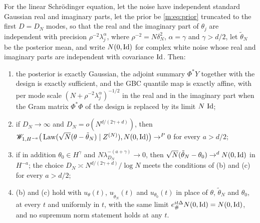 \begin{proposition}\label{m:prop:sch}
For the linear Schr\"odinger equation, let the noise have independent standard Gaussian real and imaginary parts, let the prior be \eqref{m:eq:prior} truncated to the first $D=D_N$ modes, so that the real and the imaginary part of $\theta_j$ are independent with precision $\rho^{-2}\lambda_j^\alpha$, where $\rho^{-2}=N\delta_N^2$, $\alpha=\gamma$ and $\gamma>d/2$, let $\tilde\theta_N$ be the posterior mean, and write $N(0,\operatorname{Id})$ for complex white noise whose real and imaginary parts are independent with covariance $\operatorname{Id}$. Then:
\begin{enumerate}[label=(\alph*),nosep,leftmargin=2.2em]
\item the posterior is exactly Gaussian, the adjoint summary $\Phi^*Y$ together with the design is exactly sufficient, and the GBC quantile map is exactly affine, with per mode scale $(N+\rho^{-2}\lambda_j^\alpha)^{-1/2}$ in the real and in the imaginary part when the Gram matrix $\Phi^*\Phi$ of the design is replaced by its limit $N\,\operatorname{Id}$;
\item if $D_N\to\infty$ and $D_N=o(N^{d/(2\gamma+d)})$, then $\mathscr{W}_{1,H^{-a}}\big(\operatorname{Law}(\sqrt N(\theta-\tilde\theta_N)\mid Z^{(N)}),N(0,\operatorname{Id})\big)\to^P0$ for every $a>d/2$;
\item if in addition $\theta_0\in H^\gamma$ and $N\lambda_{D_N}^{-(a+\gamma)}\to0$, then $\sqrt N(\tilde\theta_N-\theta_0)\to^dN(0,\operatorname{Id})$ in $H^{-a}$; the choice $D_N\asymp N^{d/(2\gamma+d)}/\log N$ meets the conditions of (b) and (c) for every $a>d/2$;
\item (b) and (c) hold with $u_\theta(t)$, $u_{\tilde\theta_N}(t)$ and $u_{\theta_0}(t)$ in place of $\theta$, $\tilde\theta_N$ and $\theta_0$, at every $t$ and uniformly in $t$, with the same limit $e^{it\Delta}_\#N(0,\operatorname{Id})=N(0,\operatorname{Id})$, and no supremum norm statement holds at any $t$.
\end{enumerate}
\end{proposition}

